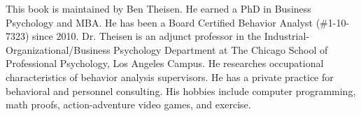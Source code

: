 This book is maintained by Ben Theisen. He earned a PhD in Business Psychology and MBA. He has been a Board Certified Behavior Analyst (\#1-10-7323) since 2010. Dr. Theisen is an adjunct professor in the Industrial-Organizational/Business Psychology Department at The Chicago School of Professional Psychology, Los Angeles Campus. He researches occupational characteristics of behavior analysis supervisors. He has a private practice for behavioral and personnel consulting. His hobbies include computer programming, math proofs, action-adventure video games, and exercise.

\clearpage

